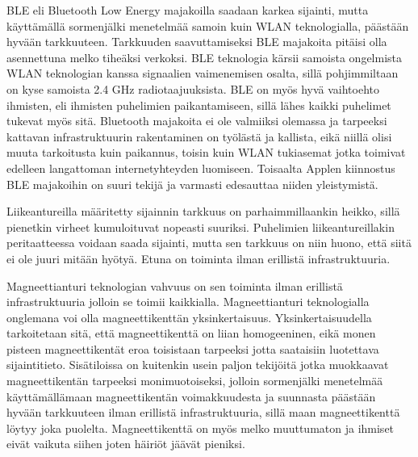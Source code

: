 BLE eli Bluetooth Low Energy majakoilla saadaan karkea sijainti, mutta käyttämällä sormenjälki menetelmää samoin kuin WLAN teknologialla, päästään hyvään tarkkuuteen. Tarkkuuden saavuttamiseksi BLE majakoita pitäisi olla asennettuna melko tiheäksi verkoksi. BLE teknologia kärsii samoista ongelmista WLAN teknologian kanssa signaalien vaimenemisen osalta, sillä pohjimmiltaan on kyse samoista 2.4 GHz radiotaajuuksista. BLE on myös hyvä vaihtoehto ihmisten, eli ihmisten puhelimien paikantamiseen, sillä lähes kaikki puhelimet tukevat myös sitä.
Bluetooth majakoita ei ole valmiiksi olemassa ja tarpeeksi kattavan infrastruktuurin rakentaminen on työlästä ja kallista, eikä niillä olisi muuta tarkoitusta kuin paikannus, toisin kuin WLAN tukiasemat jotka toimivat edelleen langattoman internetyhteyden luomiseen. Toisaalta Applen kiinnostus BLE majakoihin on suuri tekijä ja varmasti edesauttaa niiden yleistymistä.

Liikeantureilla määritetty sijainnin tarkkuus on parhaimmillaankin heikko, sillä pienetkin virheet kumuloituvat nopeasti suuriksi. Puhelimien liikeantureillakin peritaatteessa voidaan saada sijainti, mutta sen tarkkuus on niin huono, että siitä ei ole juuri mitään hyötyä. Etuna on toiminta ilman erillistä infrastruktuuria.

Magneettianturi teknologian vahvuus on sen toiminta ilman erillistä infrastruktuuria jolloin se toimii kaikkialla. Magneettianturi teknologialla onglemana voi olla magneettikenttän yksinkertaisuus. Yksinkertaisuudella tarkoitetaan sitä, että magneettikenttä on liian homogeeninen, eikä monen pisteen magneettikentät eroa toisistaan tarpeeksi jotta saataisiin luotettava sijaintitieto. Sisätiloissa on kuitenkin usein paljon tekijöitä jotka muokkaavat magneettikentän tarpeeksi monimuotoiseksi, jolloin sormenjälki menetelmää käyttämällämaan magneettikentän voimakkuudesta ja suunnasta päästään hyvään tarkkuuteen ilman erillistä infrastruktuuria, sillä maan magneettikenttä löytyy joka puolelta. Magneettikenttä on myös melko muuttumaton ja ihmiset eivät vaikuta siihen joten häiriöt jäävät pieniksi. 

